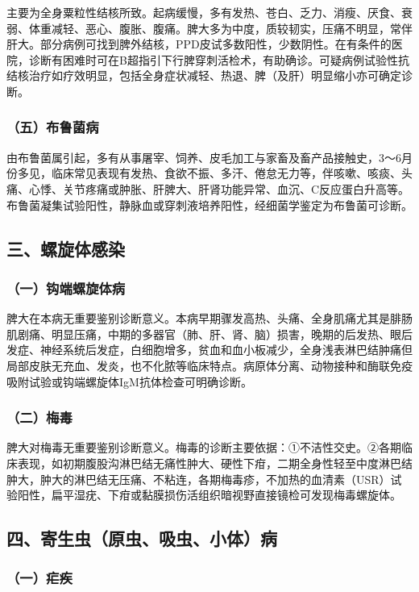 主要为全身粟粒性结核所致。起病缓慢，多有发热、苍白、乏力、消瘦、厌食、衰弱、体重减轻、恶心、腹胀、腹痛。脾大多为中度，质较韧实，压痛不明显，常伴肝大。部分病例可找到脾外结核，PPD皮试多数阳性，少数阴性。在有条件的医院，诊断有困难时可在B超指引下行脾穿刺活检术，有助确诊。可疑病例试验性抗结核治疗如疗效明显，包括全身症状减轻、热退、脾（及肝）明显缩小亦可确定诊断。

\subsubsection{（五）布鲁菌病}

由布鲁菌属引起，多有从事屠宰、饲养、皮毛加工与家畜及畜产品接触史，3～6月份多见，临床常见表现有发热、食欲不振、多汗、倦怠无力等，伴咳嗽、咳痰、头痛、心悸、关节疼痛或肿胀、肝脾大、肝肾功能异常、血沉、C反应蛋白升高等。布鲁菌凝集试验阳性，静脉血或穿刺液培养阳性，经细菌学鉴定为布鲁菌可诊断。

\subsection{三、螺旋体感染}

\subsubsection{（一）钩端螺旋体病}

脾大在本病无重要鉴别诊断意义。本病早期骤发高热、头痛、全身肌痛尤其是腓肠肌剧痛、明显压痛，中期的多器官（肺、肝、肾、脑）损害，晚期的后发热、眼后发症、神经系统后发症，白细胞增多，贫血和血小板减少，全身浅表淋巴结肿痛但局部皮肤无充血、发炎，也不化脓等临床特点。病原体分离、动物接种和酶联免疫吸附试验或钩端螺旋体IgM抗体检查可明确诊断。

\subsubsection{（二）梅毒}

脾大对梅毒无重要鉴别诊断意义。梅毒的诊断主要依据：①不洁性交史。②各期临床表现，如初期腹股沟淋巴结无痛性肿大、硬性下疳，二期全身性轻至中度淋巴结肿大，肿大的淋巴结无压痛、不粘连，各期梅毒疹，不加热的血清素（USR）试验阳性，扁平湿疣、下疳或黏膜损伤活组织暗视野直接镜检可发现梅毒螺旋体。

\subsection{四、寄生虫（原虫、吸虫、小体）病}

\subsubsection{（一）疟疾}

